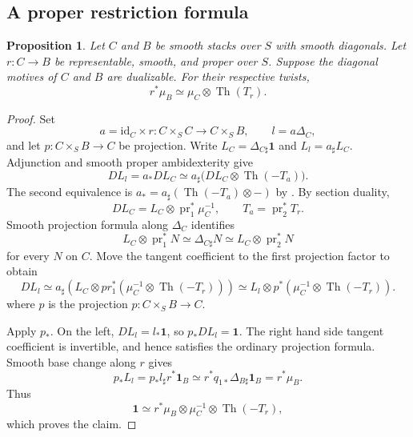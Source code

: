 \documentclass[11pt,reqno]{amsart}
\newtheorem{proposition}[theorem]{Proposition}
\theoremstyle{definition}
\theoremstyle{remark}
\theoremstyle{plain}
\numberwithin{equation}{section}
\newcommand{\one}{\mathbf 1}
\DeclareMathOperator{\Th}{Th}
\begin{document}
\subsection{A proper restriction formula}
\begin{proposition}\label{prop:new-proper-restriction}
Let \(C\) and \(B\) be smooth stacks over \(S\) with smooth diagonals.
Let \(r:C\to B\) be representable, smooth, and proper over \(S\).
Suppose the diagonal motives of \(C\) and \(B\) are dualizable.
For their respective twists,
\begin{equation}\label{eq:new-proper-restriction}
 r^*\mu_B\simeq\mu_C\otimes\Th(T_r).
\end{equation}
\end{proposition}
\begin{proof}
Set
\[
 a=\mathrm{id}_C\times r:C\times_S C\to C\times_S B,\qquad
 l=a\Delta_C,
\]
and let \(p:C\times_S B\to C\) be projection.
Write \(L_C=\Delta_{C\sharp}\one\) and \(L_l=a_\sharp L_C\).
Adjunction and smooth proper ambidexterity give
\[
 DL_l=a_*DL_C
 \simeq a_\sharp\bigl(DL_C\otimes\Th(-T_a)\bigr).
\]
The second equivalence is \(a_*=a_\sharp(\Th(-T_a)\otimes-)\) by \cite[Theorem~6.9]{Hoyois}.
By section duality,
\[
 DL_C=L_C\otimes\operatorname{pr}_1^*\mu_C^{-1},
 \qquad T_a=\operatorname{pr}_2^*T_r.
\]
Smooth projection formula along \(\Delta_C\) identifies
\[
 L_C\otimes\operatorname{pr}_1^*N
 \simeq\Delta_{C\sharp}N
 \simeq L_C\otimes\operatorname{pr}_2^*N
\]
for every \(N\) on \(C\).
Move the tangent coefficient to the first projection factor to obtain
\[
 DL_l\simeq a_{\sharp}(L_C \otimes pr_1^*(\mu_C^{-1} \otimes \Th(-T_r)) )
\simeq L_l\otimes p^*(\mu_C^{-1}\otimes\Th(-T_r)).
\]
where \(p\) is the projection \(p: C \times_S B \to C.\)

Apply \(p_*\).
On the left, \(DL_l=l_*\one\), so \(p_*DL_l=\one\).
The right hand side tangent coefficient is invertible, and hence satisfies the ordinary projection formula.
Smooth base change along \(r\) gives 
\[p_*L_l =
p_* l_{\sharp} r^* \one_B 
\simeq r^* q_{1*} \Delta_{B\sharp} \one_B
= r^*\mu_B .\]
Thus
\[
 \one\simeq r^*\mu_B\otimes\mu_C^{-1}\otimes\Th(-T_r),
\]
which proves the claim.
\end{proof}
\end{document}
